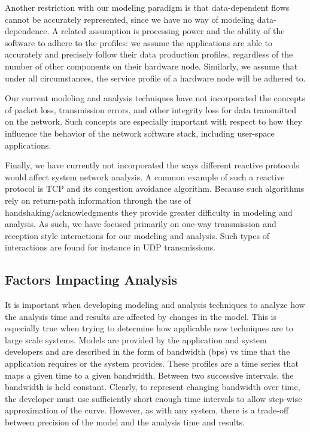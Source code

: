 Another restriction with our modeling paradigm is that data-dependent
flows cannot be accurately represented, since we have no way of
modeling data-dependence.  A related assumption is processing power
and the ability of the software to adhere to the profiles: we assume
the applications are able to accurately and precisely follow their
data production profiles, regardless of the number of other components
on their hardware node.  Similarly, we assume that under all
circumstances, the service profile of a hardware node will be adhered
to.

Our current modeling and analysis techniques have not incorporated the
concepts of packet loss, transmission errors, and other integrity loss
for data transmitted on the network.  Such concepts are especially
important with respect to how they influence the behavior of the
network software stack, including user-space applications.  

Finally, we have currently not incorporated the ways different
reactive protocols would affect system network analysis.  A common
example of such a reactive protocol is TCP and its congestion
avoidance algorithm.  Because such algorithms rely on return-path
information through the use of handshaking/acknowledgments they
provide greater difficulty in modeling and analysis.  As such, we have
focused primarily on one-way transmission and reception style
interactions for our modeling and analysis.  Such types of
interactions are found for instance in UDP transmissions.

\subsection{Factors Impacting Analysis}
\label{subsec:impacts}

It is important when developing modeling and analysis techniques to
analyze how the analysis time and results are affected by changes in
the model.  This is especially true when trying to determine how
applicable new techniques are to large scale systems.  Models are
provided by the application and system developers and are described in
the form of bandwidth (bps) vs time that the application requires or
the system provides.  These profiles are a time series that maps a
given time to a given bandwidth.  Between two successive intervals,
the bandwidth is held constant.  Clearly, to represent changing
bandwidth over time, the developer must use sufficiently short enough
time intervals to allow step-wise approximation of the curve.
However, as with any system, there is a trade-off between precision of
the model and the analysis time and results.

